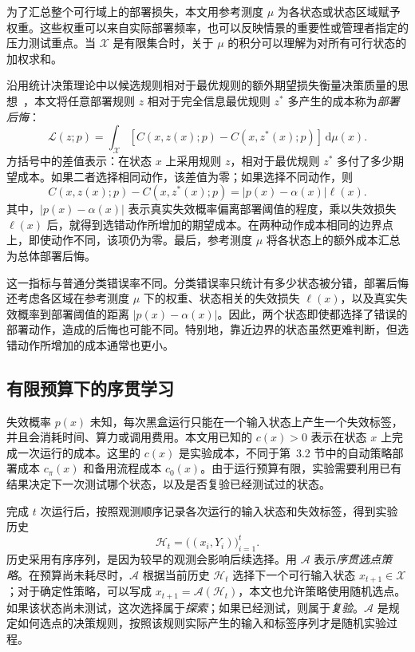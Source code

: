 \documentclass[UTF8,11pt,a4paper,fontset=none]{ctexart}
\newcommand{\X}{\mathcal X}
\newcommand{\Hh}{\mathcal H}
\newcommand{\Aacq}{\mathcal A}
\newcommand{\1}{\mathbf 1}
\begin{document}
为了汇总整个可行域上的部署损失，本文用参考测度 $\mu$ 为各状态或状态区域赋予权重。这些权重可以来自实际部署频率，也可以反映情景的重要性或管理者指定的压力测试重点。当 $\X$ 是有限集合时，关于 $\mu$ 的积分可以理解为对所有可行状态的加权求和。

沿用统计决策理论中以候选规则相对于最优规则的额外期望损失衡量决策质量的思想~\cite{berger1985}，本文将任意部署规则 $z$ 相对于完全信息最优规则 $z^*$ 多产生的成本称为\emph{部署后悔}：
\begin{equation}
  \mathcal L(z;p)
  =\int_{\X}
  \left[C(x,z(x);p)-C(x,z^*(x);p)\right]\,\mathrm d\mu(x).
  \label{eq:deployment-regret}
\end{equation}
方括号中的差值表示：在状态 $x$ 上采用规则 $z$，相对于最优规则 $z^*$ 多付了多少期望成本。如果二者选择相同动作，该差值为零；如果选择不同动作，则
\begin{equation}
  C(x,z(x);p)-C(x,z^*(x);p)
  =|p(x)-\alpha(x)|\ell(x).
  \label{eq:local-regret}
\end{equation}
其中，$|p(x)-\alpha(x)|$ 表示真实失效概率偏离部署阈值的程度，乘以失效损失 $\ell(x)$ 后，就得到选错动作所增加的期望成本。在两种动作成本相同的边界点上，即使动作不同，该项仍为零。最后，参考测度 $\mu$ 将各状态上的额外成本汇总为总体部署后悔。

这一指标与普通分类错误率不同。分类错误率只统计有多少状态被分错，部署后悔还考虑各区域在参考测度 $\mu$ 下的权重、状态相关的失效损失 $\ell(x)$，以及真实失效概率到部署阈值的距离 $|p(x)-\alpha(x)|$。因此，两个状态即使都选择了错误的部署动作，造成的后悔也可能不同。特别地，靠近边界的状态虽然更难判断，但选错动作所增加的成本通常也更小。

\subsection{有限预算下的序贯学习}

失效概率 $p(x)$ 未知，每次黑盒运行只能在一个输入状态上产生一个失效标签，并且会消耗时间、算力或调用费用。本文用已知的 $c(x)>0$ 表示在状态 $x$ 上完成一次运行的成本。这里的 $c(x)$ 是实验成本，不同于第~3.2 节中的自动策略部署成本 $c_\pi(x)$ 和备用流程成本 $c_0(x)$。由于运行预算有限，实验需要利用已有结果决定下一次测试哪个状态，以及是否复验已经测试过的状态。

完成 $t$ 次运行后，按照观测顺序记录各次运行的输入状态和失效标签，得到实验历史
\begin{equation}
  \Hh_t=\bigl((x_i,Y_i)\bigr)_{i=1}^{t}.
\end{equation}
历史采用有序序列，是因为较早的观测会影响后续选择。用 $\Aacq$ 表示\emph{序贯选点策略}。在预算尚未耗尽时，$\Aacq$ 根据当前历史 $\Hh_t$ 选择下一个可行输入状态 $x_{t+1}\in\X$；对于确定性策略，可以写成 $x_{t+1}=\Aacq(\Hh_t)$，本文也允许策略使用随机选点。如果该状态尚未测试，这次选择属于\emph{探索}；如果已经测试，则属于\emph{复验}。$\Aacq$ 是规定如何选点的决策规则，按照该规则实际产生的输入和标签序列才是随机实验过程。
\end{document}

